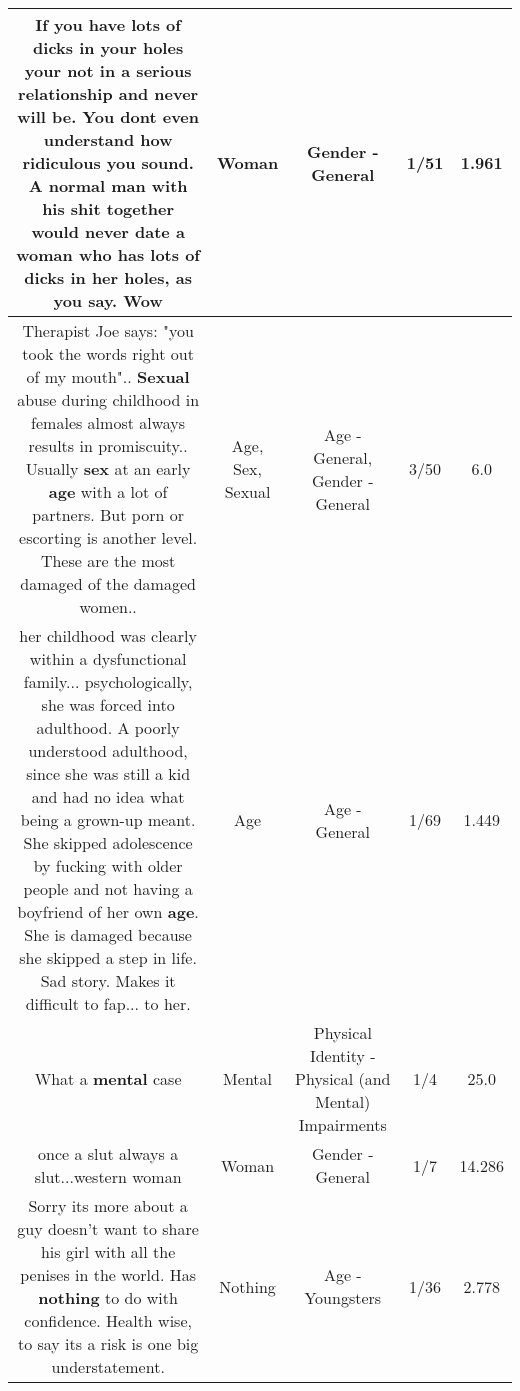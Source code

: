 \documentclass[11pt]{article}
\newlength\mylength
\begin{document}
\begin{center}
\begin{longtable}{|C{.65\mylength}|C{.30\mylength}|C{.12\mylength}|C{.12\mylength}|C{.12\mylength}|}
  \small If you have lots of dicks in your holes your not in a serious relationship and never will be. You dont even understand how ridiculous you sound. A normal man with his shit together would never date a \textbf{woman} who has lots of dicks in her holes, as you say. Wow\normalsize   & Woman & Gender - General & 1/51 & 1.961 \\  \hline
  \small Therapist Joe says: "you took the words right out of my mouth".. \textbf{Sexual} abuse during childhood in females almost always results in promiscuity.. Usually \textbf{sex} at an early \textbf{age} with a lot of partners. But porn or escorting is another level. These are the most damaged of the damaged women..\normalsize   & Age, Sex, Sexual & Age - General, Gender - General & 3/50 & 6.0 \\  \hline
  \small her childhood was clearly within a dysfunctional family... psychologically, she was forced into adulthood. A poorly understood adulthood, since she was still a kid and had no idea what being a grown-up meant. She skipped adolescence by fucking with older people and not having a boyfriend of her own \textbf{age}. She is damaged because she skipped a step in life. Sad story. Makes it difficult to fap... to her.\normalsize   & Age & Age - General & 1/69 & 1.449 \\  \hline
  \small What a \textbf{mental} case\normalsize   & Mental & Physical Identity - Physical (and Mental) Impairments & 1/4 & 25.0 \\  \hline
  \small once a slut always a slut...western woman\normalsize   & Woman & Gender - General & 1/7 & 14.286 \\  \hline
  \small Sorry its more about a guy doesn't want to share his girl with all the penises in the world. Has \textbf{nothing} to do with confidence. Health wise,  to say its a risk is one big understatement.\normalsize   & Nothing & Age - Youngsters & 1/36 & 2.778 \\  \hline

\end{longtable}
\end{center}
\end{document}
